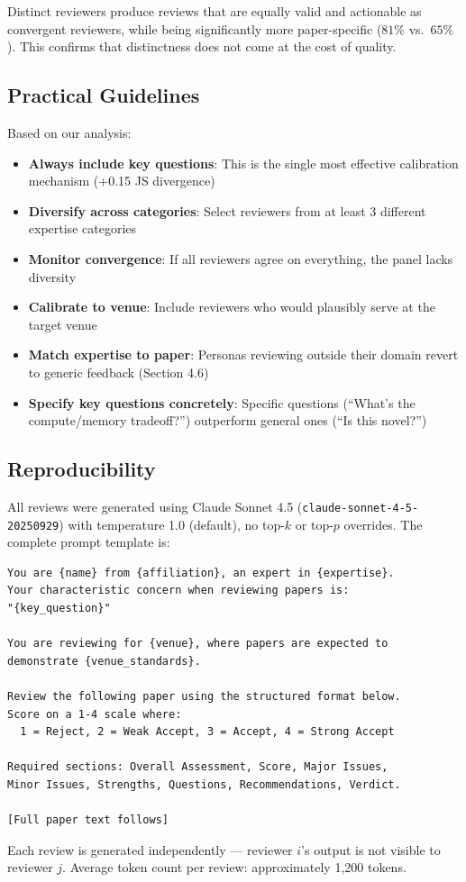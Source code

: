 \noindent Distinct reviewers produce reviews that are equally valid and actionable as convergent reviewers, while being significantly more paper-specific ($81\%$ vs.\ $65\%$). This confirms that distinctness does not come at the cost of quality.

\subsection{Practical Guidelines}

Based on our analysis:
\begin{itemize}
    \item \textbf{Always include key questions}: This is the single most effective calibration mechanism (+0.15 JS divergence)
    \item \textbf{Diversify across categories}: Select reviewers from at least 3 different expertise categories
    \item \textbf{Monitor convergence}: If all reviewers agree on everything, the panel lacks diversity
    \item \textbf{Calibrate to venue}: Include reviewers who would plausibly serve at the target venue
    \item \textbf{Match expertise to paper}: Personas reviewing outside their domain revert to generic feedback (Section 4.6)
    \item \textbf{Specify key questions concretely}: Specific questions (``What's the compute/memory tradeoff?'') outperform general ones (``Is this novel?'')
\end{itemize}

\subsection{Reproducibility}

All reviews were generated using Claude Sonnet 4.5 (\texttt{claude-sonnet-4-5-20250929}) with temperature 1.0 (default), no top-$k$ or top-$p$ overrides. The complete prompt template is:

\begin{lstlisting}
You are {name} from {affiliation}, an expert in {expertise}.
Your characteristic concern when reviewing papers is:
"{key_question}"

You are reviewing for {venue}, where papers are expected to
demonstrate {venue_standards}.

Review the following paper using the structured format below.
Score on a 1-4 scale where:
  1 = Reject, 2 = Weak Accept, 3 = Accept, 4 = Strong Accept

Required sections: Overall Assessment, Score, Major Issues,
Minor Issues, Strengths, Questions, Recommendations, Verdict.

[Full paper text follows]
\end{lstlisting}

\noindent Each review is generated independently --- reviewer $i$'s output is not visible to reviewer $j$. Average token count per review: approximately 1,200 tokens.
